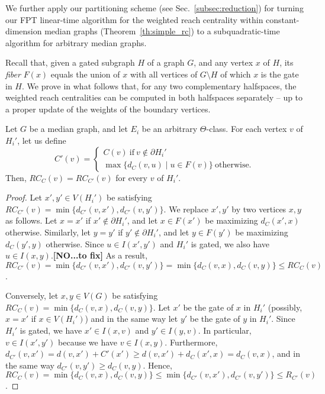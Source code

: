 We further apply our partitioning scheme (see Sec.~\ref{subsec:reduction}) for turning our FPT linear-time algorithm for the weighted reach centrality within constant-dimension median graphs (Theorem~\ref{th:simple_rc}) to a subquadratic-time algorithm for arbitrary median graphs.

Recall that, given a gated subgraph $H$ of a graph $G$, and any vertex $x$ of $H$, its {\em fiber} $F(x)$ equals the union of $x$ with all vertices of $G \setminus H$ of which $x$ is the gate in $H$.
We prove in what follows that, for any two complementary halfspaces, the weighted reach centralities can be computed in both halfspaces separately -- up to a proper update of the weights of the boundary vertices.

\begin{lemma}\label{lem:guigui-rc-1}
Let $G$ be a median graph, and let $E_i$ be an arbitrary $\Theta$-class.
For each vertex $v$ of $H_i'$, let us define $$C'(v) = \begin{cases} C(v) \ \text{if} \ v \notin \partial H_i' \\
\max\{ d_C(v,u) \mid u \in F(v) \} \ \text{otherwise.}
\end{cases}$$
Then, $RC_{C}(v) = RC_{C'}(v)$ for every $v$ of $H_i'$.
\end{lemma}
\begin{proof}
Let $x',y' \in V(H_i')$ be satisfying $RC_{C'}(v) = \min\{d_{C'}(v,x'),d_{C'}(v,y')\}$.
We replace $x',y'$ by two vertices $x,y$ as follows.
Let $x = x'$ if $x' \notin \partial H_i'$, and let $x \in F(x')$ be maximizing $d_C(x',x)$ otherwise.
Similarly, let $y = y'$ if $y' \notin \partial H_i'$, and let $y \in F(y')$ be maximizing $d_C(y',y)$ otherwise.
Since $u \in I(x',y')$ and $H_i'$ is gated, we also have $u \in I(x,y)$.{\color{red}\bf[NO...to fix]}
As a result, $RC_{C'}(v) = \min\{d_{C'}(v,x'),d_{C'}(v,y')\} = \min\{d_C(v,x),d_C(v,y)\} \leq RC_C(v)$.

Conversely, let $x,y \in V(G)$ be satisfying $RC_{C}(v) = \min\{d_{C}(v,x),d_{C}(v,y)\}$.
Let $x'$ be the gate of $x$ in $H_i'$ (possibly, $x=x'$ if $x \in V(H_i')$) and in the same way let $y'$ be the gate of $y$ in $H_i'$.
Since $H_i'$ is gated, we have $x' \in I(x,v)$ and $y' \in I(y,v)$.
In particular, $v \in I(x',y')$ because we have $v \in I(x,y)$.
Furthermore, $d_{C'}(v,x') = d(v,x') + C'(x') \geq d(v,x') + d_C(x',x) = d_C(v,x)$, and in the same way $d_{C'}(v,y') \geq d_C(v,y)$.
Hence, $RC_{C}(v) = \min\{d_{C}(v,x),d_{C}(v,y)\} \leq \min\{d_{C'}(v,x'),d_{C'}(v,y')\} \leq R_{C'}(v)$.
\end{proof}

